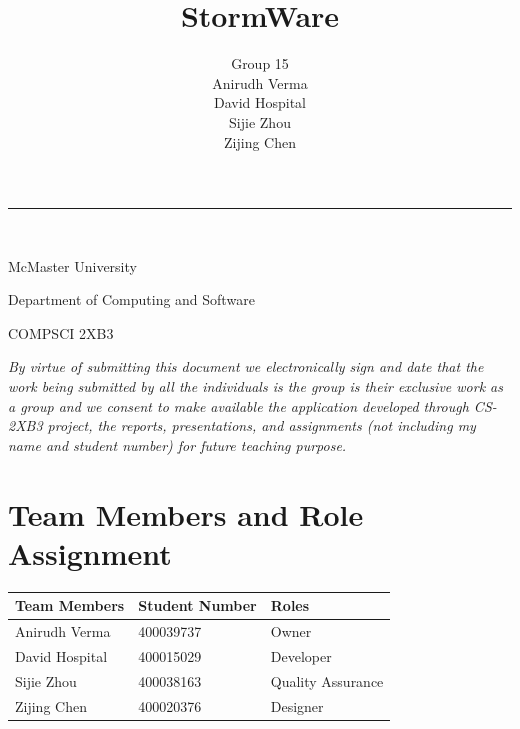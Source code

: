 \documentclass[12pt]{article}
\begin{document}
\title{\textbf{StormWare}}
\author{Group 15\\ Anirudh Verma\\ David Hospital\\ Sijie Zhou\\ Zijing Chen}
\maketitle

\begin{center}
\rule{7cm}{0.4pt}\\
\thispagestyle{empty}
\parskip=14pt%
\vspace*{3\parskip}%

McMaster University

Department of Computing and Software

COMPSCI 2XB3



\end{center}

\newpage

\tableofcontents


\newpage

\hspace{0pt}
\vfill
\textit{By virtue of submitting this document we electronically sign and date that the work being submitted by all the individuals is the group is their exclusive work as a group and we consent to make available the application developed through CS-2XB3 project, the reports, presentations, and assignments (not including my name and student number) for future teaching purpose.}
\vfill
\hspace{0pt}
\newpage


\section{Team Members and Role Assignment}

\begin{tabular}{| l | l | l |}
\hline
\textbf{Team Members} & \textbf{Student Number }& \textbf{Roles }\\
\hline
Anirudh Verma	&400039737	&Owner \\
\hline
David Hospital	&400015029	&Developer\\
\hline
Sijie Zhou	&400038163	&Quality Assurance\\
\hline
Zijing Chen	&400020376	&Designer\\
\hline
\end{tabular}
\end{document}
